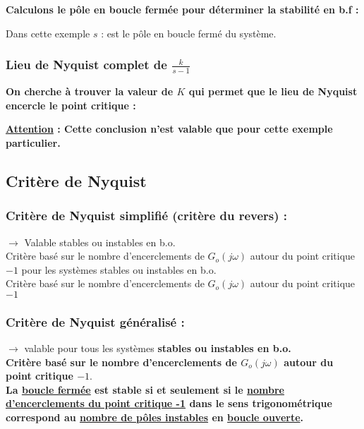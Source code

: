 \documentclass[document.tex]{subfiles}
\begin{document}
\textbf{Calculons le pôle en boucle fermée pour déterminer la stabilité en b.f : }


Dans cette exemple $s$ : est le pôle en boucle fermé du système.

\subsubsection{Lieu de Nyquist complet de $\frac{k}{s-1}$}


\textbf{On cherche à trouver la valeur de $K$ qui permet que le lieu de Nyquist encercle le point critique : }


\textbf{\underline{Attention} : Cette conclusion n'est valable que pour cette exemple particulier.}

\subsection{Critère de Nyquist}

\subsubsection{Critère de Nyquist simplifié (critère du revers) :}
$\rightarrow$ \; Valable stables ou instables en b.o.\\ 
Critère basé sur le nombre d'encerclements de $G_o(j \omega)$ autour du point critique $-1$ pour les systèmes stables ou instables en b.o.\\ 
Critère basé sur le nombre d'encerclements de $G_o(j \omega)$ autour du point critique $-1$

\subsubsection{Critère de Nyquist généralisé :}

$\rightarrow$ \; valable pour tous les systèmes \textbf{stables ou instables en b.o.\\ 
Critère basé sur le nombre d'encerclements de $G_o(j \omega)$ autour du point critique $-1$}.\\

\textbf{La \underline{boucle fermée} est stable si et seulement si le \underline{nombre d'encerclements du point critique -1} dans le sens trigonométrique correspond au \underline{nombre de pôles instables} en \underline{boucle ouverte}.}
\end{document}
